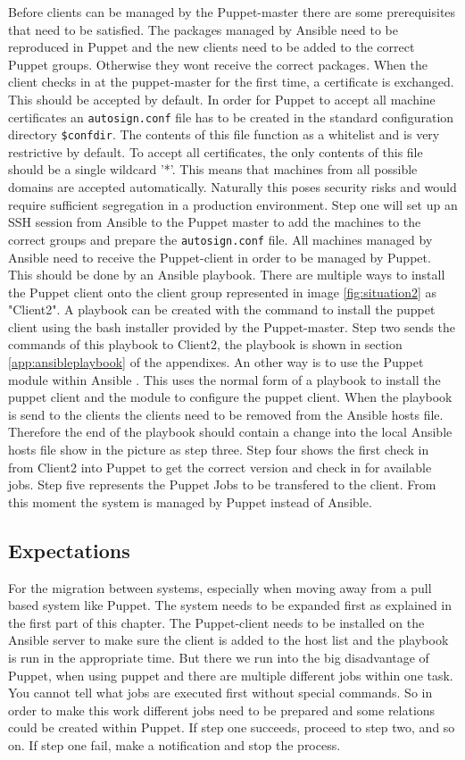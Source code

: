 Before clients can be managed by the Puppet-master there are some prerequisites that need to be satisfied. The packages managed by Ansible need to be reproduced in Puppet and the new clients need to be added to the correct Puppet groups. Otherwise they wont receive the correct packages. When the client checks in at the puppet-master for the first time, a certificate is exchanged. This should be accepted by default. In order for Puppet to accept all machine certificates an \texttt{autosign.conf} file has to be created in the standard configuration directory \texttt{\$confdir}. The contents of this file function as a whitelist and is very restrictive by default. To accept all certificates, the only contents of this file should be a single wildcard '*'. This means that machines from all possible domains are accepted automatically. Naturally this poses security risks and would require sufficient segregation in a production environment. Step one will set up an SSH session from Ansible to the Puppet master to add the machines to the correct groups and prepare the \texttt{autosign.conf} file. All machines managed by Ansible need to receive the Puppet-client in order to be managed by Puppet. This should be done by an Ansible playbook. There are multiple ways to install the Puppet client onto the client group represented in image \ref{fig:situation2} as "Client2". A playbook can be created with the command to install the puppet client using the bash installer provided by the Puppet-master. Step two sends the commands of this playbook to Client2, the playbook is shown in section \ref{app:ansibleplaybook} of the appendixes. An other way is to use the Puppet module within Ansible \cite{ansiblepuppet}. This uses the normal form of a playbook to install the puppet client and the module to configure the puppet client. When the playbook is send to the clients the clients need to be removed from the Ansible hosts file. Therefore the end of the playbook should contain a change into the local Ansible hosts file show in the picture as step three.  Step four shows the first check in from Client2 into Puppet to get the correct version and check in for available jobs. Step five represents the Puppet Jobs to be transfered to the client. From this moment the system is managed by Puppet instead of Ansible.    

\subsection{Expectations}\label{subsec:expectations}
For the migration between systems, especially when moving away from a pull based system like Puppet. The system needs to be expanded first as explained in the first part of this chapter. The Puppet-client needs to be installed on the Ansible server to make sure the client is added to the host list and the playbook is run in the appropriate time. But there we run into the big disadvantage of Puppet, when using puppet and there are multiple different jobs within one task. You cannot tell what jobs are executed first without special commands. So in order to make this work different jobs need to be prepared and some relations could be created within Puppet. If step one succeeds, proceed to step two, and so on. If step one fail, make a notification and stop the process.   

